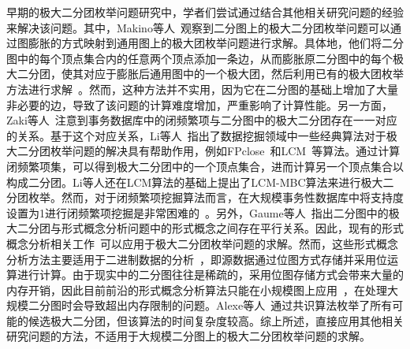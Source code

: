 早期的极大二分团枚举问题研究中，学者们尝试通过结合其他相关研究问题的经验来解决该问题。其中，Makino等人~\cite{Makino04}观察到二分图上的极大二分团枚举问题可以通过图膨胀的方式映射到通用图上的极大团枚举问题进行求解。具体地，他们将二分图中的每个顶点集合内的任意两个顶点添加一条边，从而膨胀原二分图中的每个极大二分团，使其对应于膨胀后通用图中的一个极大团，然后利用已有的极大团枚举方法进行求解~\cite{MCEparallel20,MCE20,MCE22}。然而，这种方法并不实用，因为它在二分图的基础上增加了大量非必要的边，导致了该问题的计算难度增加，严重影响了计算性能。另一方面，Zaki等人~\cite{CFI98}注意到事务数据库中的闭频繁项与二分图中的极大二分团存在一一对应的关系。基于这个对应关系，Li等人~\cite{correspondence05}指出了数据挖掘领域中一些经典算法对于极大二分团枚举问题的解决具有帮助作用，例如FPclose~\cite{fpclose04}和LCM~\cite{lcm04}等算法。通过计算闭频繁项集，可以得到极大二分团中的一个顶点集合，进而计算另一个顶点集合以构成二分团。Li等人还在LCM算法的基础上提出了LCM-MBC算法来进行极大二分团枚举。然而，对于闭频繁项挖掘算法而言，在大规模事务性数据库中将支持度设置为1进行闭频繁项挖掘是非常困难的~\cite{iMBEA14}。另外，Gaume等人~\cite{fcambe10}指出二分图中的极大二分团与形式概念分析问题中的形式概念之间存在平行关系。因此，现有的形式概念分析相关工作~\cite{FCA15,FCA21,FCA22}可以应用于极大二分团枚举问题的求解。然而，这些形式概念分析方法主要适用于二进制数据的分析~\cite{FCA15}，即源数据通过位图方式存储并采用位运算进行计算。由于现实中的二分图往往是稀疏的，采用位图存储方式会带来大量的内存开销，因此目前前沿的形式概念分析算法只能在小规模图上应用~\cite{FCA21,FCA22}，在处理大规模二分图时会导致超出内存限制的问题。Alexe等人~\cite{MICA04}通过共识算法枚举了所有可能的候选极大二分团，但该算法的时间复杂度较高。综上所述，直接应用其他相关研究问题的方法，不适用于大规模二分图上的极大二分团枚举问题的求解。

